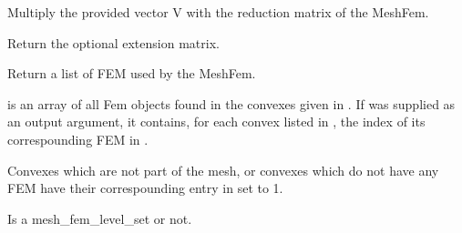 \documentclass[a4paper,11pt,english]{sphinxmanual}
\begin{document}
\begin{fulllineitems}
\begin{fulllineitems}
\label{\detokenize{python/cmdref_MeshFem:getfem.MeshFem.extend_vector}}
Multiply the provided vector V with the reduction matrix of the MeshFem.

\end{fulllineitems}


\begin{fulllineitems}
\label{\detokenize{python/cmdref_MeshFem:getfem.MeshFem.extension_matrix}}
Return the optional extension matrix.

\end{fulllineitems}


\begin{fulllineitems}
\label{\detokenize{python/cmdref_MeshFem:getfem.MeshFem.fem}}
Return a list of FEM used by the MeshFem.

 is an array of all Fem objects found in the convexes
given in . If  was supplied as an output argument,
it contains, for each convex listed in , the index of its
correspounding FEM in .

Convexes which are not part of the mesh, or convexes which do not
have any FEM have their correspounding entry in  set to \sphinxhyphen{}1.

\end{fulllineitems}


\begin{fulllineitems}
\label{\detokenize{python/cmdref_MeshFem:getfem.MeshFem.has_linked_mesh_levelset}}
Is a mesh\_fem\_level\_set or not.

\end{fulllineitems}


\end{fulllineitems}
\end{document}
